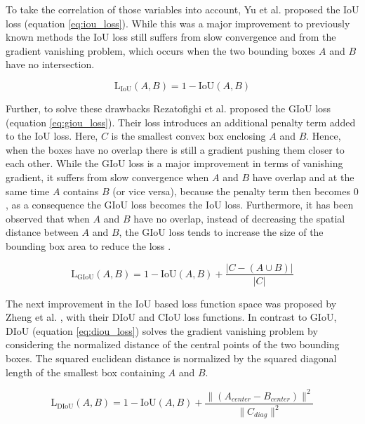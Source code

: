 To take the correlation of those variables into account, Yu et al. \cite{iou} proposed the \ac{IoU} loss (equation \ref{eq:iou_loss}).
While this was a major improvement to previously known methods the \ac{IoU} loss still suffers from slow convergence and from the gradient vanishing problem, which occurs when the two bounding boxes $A$ and $B$ have no intersection.

\begin{equation}
    \text{L}_{\text{IoU}}(A, B) = 1 - \text{IoU}(A, B)
    \label{eq:iou_loss}
\end{equation}

Further, to solve these drawbacks Rezatofighi et al. \cite{giou} proposed the \ac{GIoU} loss (equation \ref{eq:giou_loss}).
Their loss introduces an additional penalty term added to the \ac{IoU} loss.
Here, $C$ is the smallest convex box enclosing $A$ and $B$.
Hence, when the boxes have no overlap there is still a gradient pushing them closer to each other.
While the \ac{GIoU} loss is a major improvement in terms of vanishing gradient, it suffers from slow convergence when $A$ and $B$ have overlap and at the same time $A$ contains $B$ (or vice versa), because the penalty term then becomes $0$, as a consequence the \ac{GIoU} loss becomes the \ac{IoU} loss.
Furthermore, it has been observed that when $A$ and $B$ have no overlap, instead of decreasing the spatial distance between $A$ and $B$, the \ac{GIoU} loss tends to increase the size of the bounding box area to reduce the loss \cite{eiou}.

\begin{equation}
    \text{L}_{\text{GIoU}}(A, B) = 1 - \text{IoU}(A, B) + \frac{|C - (A \cup B)|}{|C|}
    \label{eq:giou_loss}
\end{equation}

The next improvement in the \ac{IoU} based loss function space was proposed by Zheng et al. \cite{diou}, with their \ac{DIoU} and \ac{CIoU} loss functions.
In contrast to \ac{GIoU}, \ac{DIoU} (equation \ref{eq:diou_loss}) solves the gradient vanishing problem by considering the normalized distance of the central points of the two bounding boxes.
The squared euclidean distance is normalized by the squared diagonal length of the smallest box containing $A$ and $B$.

\begin{equation}
    \text{L}_{\text{DIoU}}(A, B) = 1 - \text{IoU}(A, B) + \frac{\|(A_{center} - B_{center})\|^2}{\|C_{diag}\|^2}
    \label{eq:diou_loss}
\end{equation}

